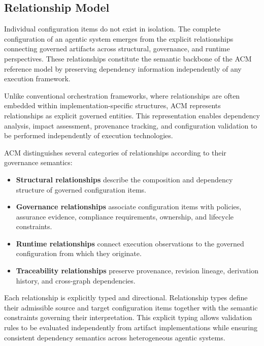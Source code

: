 \documentclass[10pt]{article}
\begin{document}
\subsection{Relationship Model}
\label{sec:configuration_relationships}

Individual configuration items do not exist in isolation. The complete configuration of an agentic system emerges from the explicit relationships connecting governed artifacts across structural, governance, and runtime perspectives. These relationships constitute the semantic backbone of the ACM reference model by preserving dependency information independently of any execution framework.

Unlike conventional orchestration frameworks, where relationships are often embedded within implementation-specific structures, ACM represents relationships as explicit governed entities. This representation enables dependency analysis, impact assessment, provenance tracking, and configuration validation to be performed independently of execution technologies.

ACM distinguishes several categories of relationships according to their governance semantics:

\begin{itemize}

\item \textbf{Structural relationships} describe the composition and dependency structure of governed configuration items.

\item \textbf{Governance relationships} associate configuration items with policies, assurance evidence, compliance requirements, ownership, and lifecycle constraints.

\item \textbf{Runtime relationships} connect execution observations to the governed configuration from which they originate.

\item \textbf{Traceability relationships} preserve provenance, revision lineage, derivation history, and cross-graph dependencies.

\end{itemize}

Each relationship is explicitly typed and directional. Relationship types define their admissible source and target configuration items together with the semantic constraints governing their interpretation. This explicit typing allows validation rules to be evaluated independently from artifact implementations while ensuring consistent dependency semantics across heterogeneous agentic systems.
\end{document}
